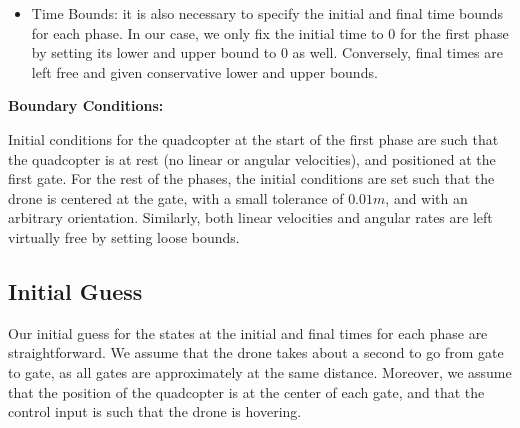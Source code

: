 \begin{itemize}
  \item Time Bounds: it is also necessary to specify the initial and final time bounds for each phase.
  In our case, we only fix the initial time to $0$ for the first phase by setting its lower and upper bound to $0$ as well.
  Conversely, final times are left free and given conservative lower and upper bounds.


\end{itemize}

\textbf{Boundary Conditions:}

Initial conditions for the quadcopter at the start of the first phase are such that the quadcopter is at rest (no linear or angular velocities), and positioned at the first gate.
For the rest of the phases, the initial conditions are set such that the drone is centered at the gate, with a small tolerance of $0.01m$, and with an arbitrary orientation.
Similarly, both linear velocities and angular rates are left virtually free by setting loose bounds.

\subsection{Initial Guess}
Our initial guess for the states at the initial and final times for each phase are straightforward.
We assume that the drone takes about a second to go from gate to gate, as all gates are approximately at the same distance.
Moreover, we assume that the position of the quadcopter is at the center of each gate, and that the control input is such that the drone is hovering.
